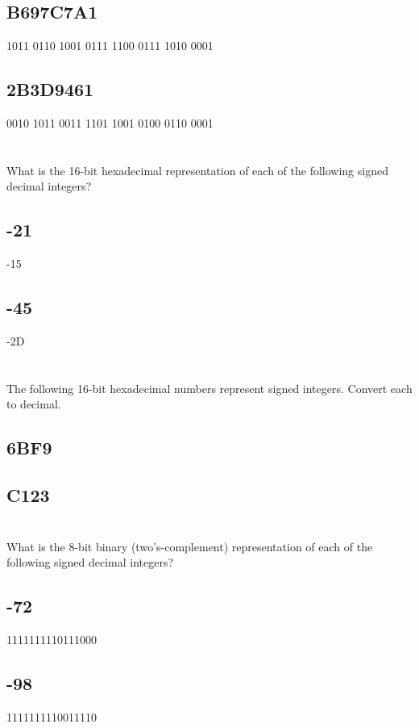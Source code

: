 \documentclass{article}
\begin{document}
\subsection{B697C7A1}
1011 0110 1001 0111 1100 0111 1010 0001

\subsection{2B3D9461}
0010 1011 0011 1101 1001 0100 0110 0001

\section{}
What is the 16-bit hexadecimal representation of each of the following signed decimal integers?

\subsection{-21}
-15

\subsection{-45}
-2D

\section{}
The following 16-bit hexadecimal numbers represent signed integers. Convert each to decimal.

\subsection{6BF9}

\subsection{C123}

\section{}
What is the 8-bit binary (two’s-complement) representation of each of the following signed decimal integers?

\subsection{-72}
1111111110111000

\subsection{-98}
1111111110011110
\end{document}
